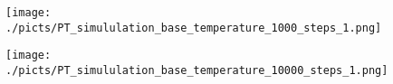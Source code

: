 
\begin{frame}[plain]

	\begin{center}
		\begin{figure}\texttt{[image: ./picts/PT\_simululation\_base\_temperature\_1000\_steps\_1.png]}\end{figure}	
	\end{center}	
		
\end{frame}

\begin{frame}[plain]

	\begin{center}
		\begin{figure}\texttt{[image: ./picts/PT\_simululation\_base\_temperature\_10000\_steps\_1.png]}\end{figure}	
	\end{center}	
		
\end{frame}




